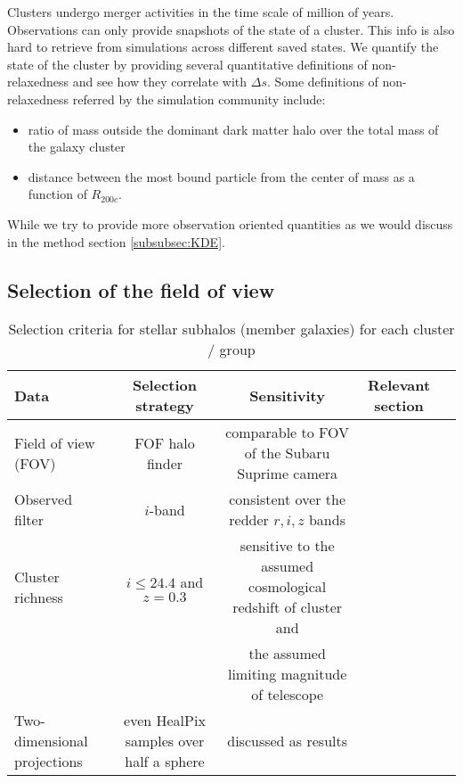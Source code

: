 Clusters undergo merger activities in the time scale of million of years. 
Observations can only provide snapshots of the state of a cluster. 
This info is also hard to retrieve from simulations across different saved
states.
We quantify the state of the cluster by providing several quantitative
definitions of non-relaxedness and see how they correlate with $\Delta s$.
Some definitions of non-relaxedness referred by the simulation community
include:
\begin{itemize}
	\item ratio of mass outside the dominant dark matter halo over the total mass
		of the galaxy cluster 
	\item distance between the most bound particle from the center of mass as a
		function of $R_{200c}$.
\end{itemize}
While we try to provide more observation oriented quantities as we would
discuss in the method section \ref{subsubsec:KDE}. 


\subsection{Selection of the field of view}
\label{sec:FOV}

\begin{table*}
\begin{center}
\begin{minipage}{180mm} 
	\caption{ Selection criteria for stellar subhalos (member galaxies) for each
		cluster / group 
\label{tab:member_galaxy_selections}} 
	\begin{tabular}{@{}lcccc@{}}
\hline 
Data &  Selection strategy  & Sensitivity & Relevant section  \\ \hline
Field of view (FOV) & FOF halo finder& comparable to FOV of the Subaru
Suprime camera &   \\ 
Observed filter & $i$-band & consistent over the redder $r, i, z$ bands &   \\ 
Cluster richness  & $i \leq 24.4$ and $z = 0.3$  & sensitive to
the assumed cosmological redshift of cluster and &    \\ 
& & the assumed limiting magnitude of telescope &   \\
Two-dimensional projections & even HealPix samples over half a sphere &
discussed as results  & \\  
\hline
\end{tabular} 
\label{tab:selection_criteria} 
\footnotesize{
}
\end{minipage}
\end{center} 
\end{table*}

